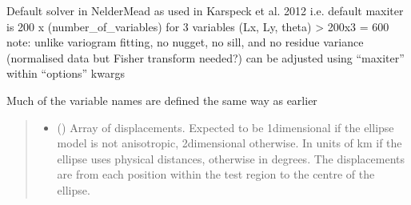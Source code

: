 \documentclass[letterpaper,10pt,english]{sphinxmanual}
\begin{document}
\begin{fulllineitems}
\begin{fulllineitems}
\label{\detokenize{ellipse:glomar_gridding.ellipse.EllipseModel.fit}}
\pysigstartsignatures
\pysiglinewithargsret
{}
{\sphinxparamcomma {}\sphinxparamcomma {}\sphinxparamcomma {}\sphinxparamcomma {}\sphinxparamcomma {}\sphinxparamcomma {}\sphinxparamcomma {}\sphinxparamcomma {}\sphinxparamcomma {}\sphinxparamcomma {}}
{}
\pysigstopsignatures
\sphinxAtStartPar
Default solver in Nelder\sphinxhyphen{}Mead as used in Karspeck et al. 2012
i.e. 
default max\sphinxhyphen{}iter is 200 x (number\_of\_variables)
for 3 variables (Lx, Ly, theta) \textendash{}\textgreater{} 200x3 = 600
note: unlike variogram fitting, no nugget, no sill, and no residue
variance (normalised data but Fisher transform needed?)
can be adjusted using “maxiter” within “options” kwargs

\sphinxAtStartPar
Much of the variable names are defined the same way as earlier
\begin{quote}\begin{description}
\begin{itemize}
\item {}
\sphinxAtStartPar
{} () \textendash{} Array of displacements. Expected to be 1\sphinxhyphen{}dimensional if the ellipse
model is not anisotropic, 2\sphinxhyphen{}dimensional otherwise. In units of km if
the ellipse uses physical distances, otherwise in degrees. The
displacements are from each position within the test region to the
centre of the ellipse.


\end{itemize}
\end{description}
\end{quote}
\end{fulllineitems}
\end{fulllineitems}
\end{document}
